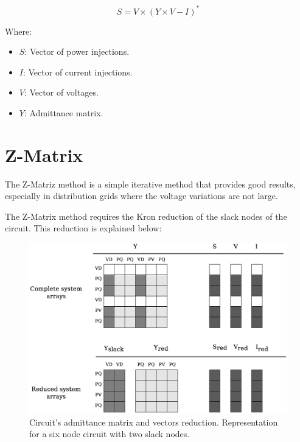 \documentclass{tufte-book}
\begin{document}
\begin{equation}
S = V \times (Y \times V - I)^*
\label{eq:power_flow}
\end{equation}


Where:

\begin{itemize}
\item $S$: Vector of power injections.
\item $I$: Vector of current injections.
\item $V$: Vector of voltages.
\item $Y$: Admittance matrix.
\end{itemize}




\section{Z-Matrix}

The Z-Matriz method is a simple iterative method that provides good results, especially in distribution grids where the voltage variations are not large.

The Z-Matrix method requires the Kron reduction of the slack nodes of the circuit. This reduction is explained below:

\begin{figure}[h!]
  \includegraphics[width=\linewidth]{img/Matrix_reduction.eps}
  \caption{Circuit's admittance matrix and vectors reduction. Representation for a six node circuit with two slack nodes.}
  \label{fig:reduction}
\end{figure}
\end{document}
